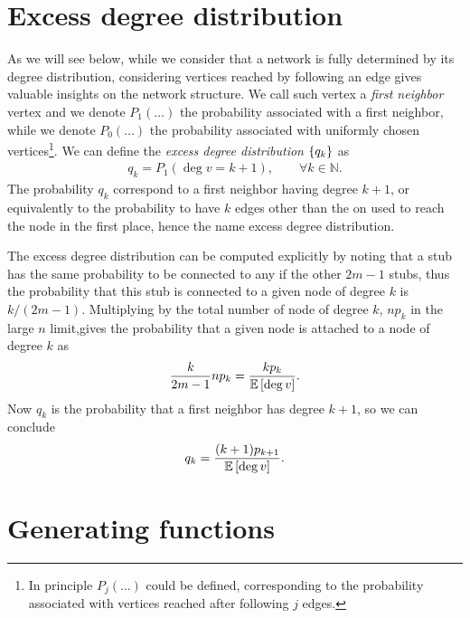 \documentclass[
11pt, %
english, %
singlespacing, %
liststotoc, %
headsepline, %
]{MastersDoctoralThesis} %
\begin{document}
\section{Excess degree distribution}

As we will see below, while we consider that a network is fully determined by its degree distribution, considering vertices reached by following an edge gives valuable insights on the network structure. We call such vertex a \emph{first neighbor} vertex and we denote $P_1(\dots)$ the probability associated with a first neighbor, while we denote $P_0(\dots)$ the probability associated with uniformly chosen vertices\footnote{In principle $P_j(\dots)$ could be defined, corresponding to the probability associated with vertices reached after following $j$ edges.}. We can define the \emph{excess degree distribution} $\{q_k\}$ as
\begin{align}
	q_k = P_1(\deg{v} = k + 1), \qquad \forall k \in \mathbb{N}.
\end{align}
The probability $q_k$ correspond to a first neighbor having degree $k + 1$, or equivalently to the probability to have $k$ edges other than the on used to reach the node in the first place, hence the name excess degree distribution.

The excess degree distribution can be computed explicitly by noting that a stub has the same probability to be connected to any if the other $2 m - 1$ stubs, thus the probability that this stub is connected to a given node of degree $k$ is $k/(2 m - 1)$. Multiplying by the total number of node of degree $k$, $n p_k$ in the large $n$ limit,gives the probability that a given node is attached to a node of degree $k$ as
\begin{align}
	\frac{k}{2 m -1} n p_k = \frac{k p_k}{\mathbb{E}\left[ \deg{v} \right]}.
\end{align}
Now $q_k$ is the probability that a first neighbor has degree $k + 1$, so we can conclude
\begin{align}
	q_k = \frac{(k + 1) p_{k+1}}{\mathbb{E}\left[ \deg{v} \right]}. \label{qk as function of pk}
\end{align}

\section{Generating functions}
\label{Section: Generating functions}
\end{document}

